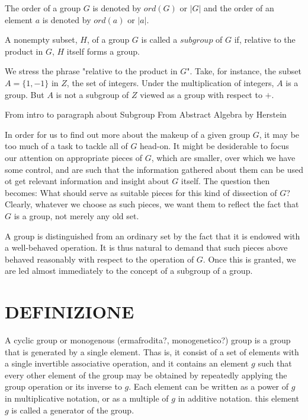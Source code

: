 \begin{osservazione}
The order of a group $G$ is denoted by $ord(G)$ or $|G|$ and the order of an element $a$ is denoted by $ord(a)$ or $|a|$. 
\end{osservazione}

\begin{definizione}
A nonempty subset, $H$, of a group $G$ is called a $subgroup$ of $G$ if, relative to the product in $G$, $H$ itself forms a group.
\end{definizione}

\begin{osservazione}
We stress the phrase "relative to the product in $G$". Take, for instance, the subset $A = \{1, -1\}$ in $Z$, the set of integers. Under the multiplication of integers,
$A$ is a group. But $A$ is not a subgroup of $Z$ viewed as a group with respect to $+$.
\end{osservazione}

\begin{osservazione}
From intro to paragraph about Subgroup From Abstract Algebra by Herstein

In order for us to find out more about the makeup of a given group $G$, it may be too much of a task to tackle all of $G$ head-on. It might be desiderable to focus our
attention on appropriate pieces of $G$, which are smaller, over which we have some control, and are such that the information gathered about them can be used ot get 
relevant information and insight about $G$ itself. The question then becomes: What should serve as suitable pieces for this kind of dissection of $G$? Clearly, whatever
we choose as such pieces, we want them to reflect the fact that $G$ is a group, not merely any old set.

A group is distinguished from an ordinary set by the fact that it is endowed with a well-behaved operation. It is thus natural to demand that such pieces above behaved
reasonably with respect to the operation of $G$. Once this is granted, we are led almost immediately to the concept of a subgroup of a group.
\end{osservazione}




\section{DEFINIZIONE}
A cyclic group or monogenous (ermafrodita?, monogenetico?) group is a group that is generated by a single element. Thas is, it consist
of a set of elements with a single invertible associative operation, and it contains an element $g$ such that every other element
of the group may be obtained by repeatedly applying the group operation or its inverse to $g$. Each element can be written as a power
of $g$ in multiplicative notation, or as a multiple of $g$ in additive notation. this element $g$ is called a generator of the group. \cite{cyclicgroup1}

